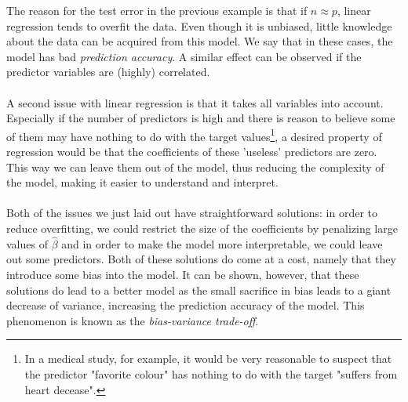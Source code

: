 The reason for the test error in the previous example is that if $n \approx p$, linear regression tends to overfit the data. Even though it is unbiased, little knowledge about the data can be acquired from this model. We say that in these cases, the model has bad \textit{prediction accuracy}. A similar effect can be observed if the predictor variables are (highly) correlated.\\
\\
A second issue with linear regression is that it takes all variables into account. Especially if the number of predictors is high and there is reason to believe some of them may have nothing to do with the target values\footnote{In a medical study, for example, it would be very reasonable to suspect that the predictor "favorite colour" has nothing to do with the target "suffers from heart decease".}, a desired property of regression would be that the coefficients of these 'useless' predictors are zero. This way we can leave them out of the model, thus reducing the complexity of the model, making it easier to understand and interpret.\\
\\
Both of the issues we just laid out have straightforward solutions: in order to reduce overfitting, we could restrict the size of the coefficients by penalizing large values of $\hat{\beta}$ and in order to make the model more interpretable, we could leave out some predictors. Both of these solutions do come at a cost, namely that they introduce some bias into the model. It can be shown, however, that these solutions do lead to a better model as the small sacrifice in bias leads to a giant decrease of variance, increasing the prediction accuracy of the model. This phenomenon is known as the \textit{bias-variance trade-off}.


